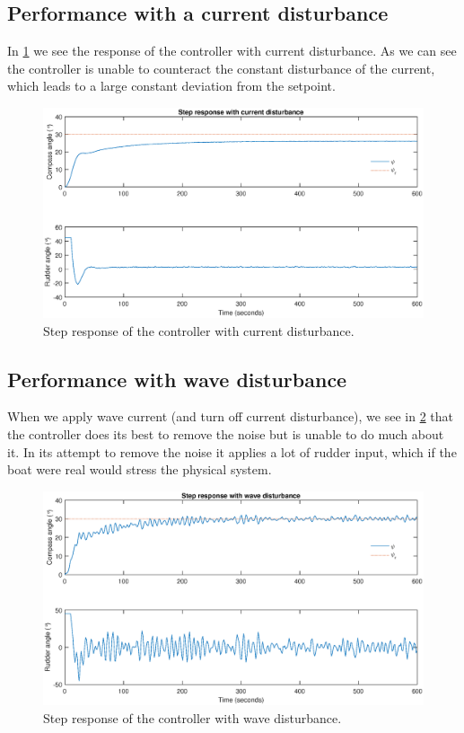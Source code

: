 \subsection{Performance with a current disturbance}

In \cref{fig:step_current_dist} we see the response of the controller with current disturbance. As we can see the controller is unable to counteract the constant disturbance of the current, which leads to a large constant deviation from the setpoint.

\begin{figure}
    \centering
    \includegraphics[width=\textwidth]{images/oppg3/stepresp_current_disturbance.eps}
    \caption{Step response of the controller with current disturbance.}
    \label{fig:step_current_dist}
\end{figure}

\subsection{Performance with wave disturbance}

When we apply wave current (and turn off current disturbance), we see in \cref{fig:step_wave_dist} that the controller does its best to remove the noise but is unable to do much about it. In its attempt to remove the noise it applies a lot of rudder input, which if the boat were real would stress the physical system.

\begin{figure}
    \centering
    \includegraphics[width=\textwidth]{images/oppg3/stepresp_wave_disturbance.eps}
    \caption{Step response of the controller with wave disturbance.}
    \label{fig:step_wave_dist}
\end{figure}

